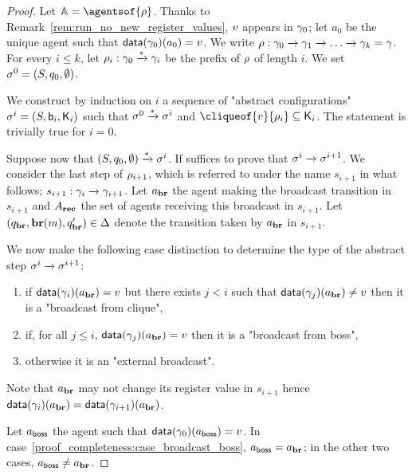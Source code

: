 \begin{proof}
	Let $\agents = \agentsof{\run}$.	
	Thanks to Remark~\ref{rem:run_no_new_register_values},  $v$ appears in $\gamma_0$; let $a_0$ be the unique agent such that $\mathsf{data}(\gamma_0)(a_0) = v$. We write $\rho : \gamma_0 \xrightarrow{} \gamma_1 \xrightarrow{} \dots \xrightarrow{} \gamma_k = \gamma$. For every $i \leq k$, let $\rho_i : \gamma_0 \xrightarrow{*} \gamma_i$ be the prefix of $\rho$ of length $i$. We set $\sigma^0 = (S, q_0, \emptyset)$.
	
	We construct by induction on $i$ a sequence of "abstract configurations" $\sigma^i = (S, \mathsf{b}_i, \mathsf{K}_i)$ such that $\sigma^0 \xrightarrow{*} \sigma^i$ and $\cliqueof{\aval}{\run_i} \subseteq \clique_i$.
	The statement is trivially true for $i=0$. 
	
	Suppose now that $(S, q_0, \emptyset) \xrightarrow{*} \sigma^i$. 
	If suffices to prove that $\sigma^i \xrightarrow{} \sigma^{i+1}$. 
	We consider the last step of $\rho_{i+1}$, which is referred to under the name $s_{i+1}$ in what follows; $s_{i+1}: \gamma_i \xrightarrow{} \gamma_{i+1}$. Let $a_{\textbf{br}}$ the agent making the broadcast transition in $s_{i+1}$ and $A_{\textbf{rec}}$ the set of agents receiving this broadcast in $s_{i+1}$. Let $(q_{\textbf{br}}, \textbf{br}(m), q_{\textbf{br}}') \in \Delta$ denote the transition taken by $a_{\textbf{br}}$ in $s_{i+1}$.
	
	We now make the following case distinction to determine the type of the abstract step $\sigma^i \xrightarrow{} \sigma^{i+1}$:
	\begin{enumerate}
		\item\label{proof_completeness:case_broadcast_clique} if $\mathsf{data}(\gamma_{i})(a_{\textbf{br}}) = v$ but there exists $j<i$ such that $\mathsf{data}(\gamma_{j})(a_{\textbf{br}}) \ne v$ then it is a "broadcast from clique",
		\item\label{proof_completeness:case_broadcast_boss} if, for all $j \leq i$, $\mathsf{data}(\gamma_j)(a_{\textbf{br}}) = v$ then it is a "broadcast from boss",
		\item\label{proof_completeness:case_external_broadcast} otherwise it is an "external broadcast". 
	\end{enumerate}
	Note that $a_{\textbf{br}}$ may not change its register value in $s_{i+1}$ hence $\mathsf{data}(\gamma_i)(a_{\textbf{br}}) = \mathsf{data}(\gamma_{i+1})(a_{\textbf{br}})$. 
	
	Let $a_{\mathsf{boss}}$ the agent such that $\mathsf{data}(\gamma_0)(a_{\mathsf{boss}}) = v$. In case~\ref{proof_completeness:case_broadcast_boss}, $a_{\mathsf{boss}} = a_{\textbf{br}}$; in the other two cases, $a_{\mathsf{boss}} \ne a_{\textbf{br}}$. 
	

\end{proof}

